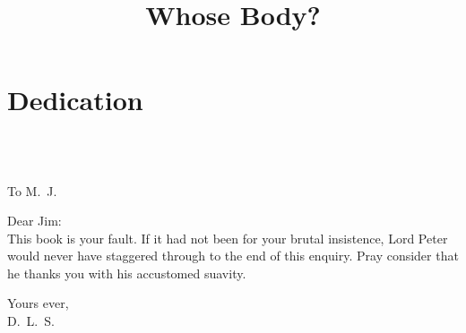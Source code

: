\documentclass[
a5paper
]{scrbook}
\title{Whose Body?}
\begin{document}
\frontmatter
 



\pagestyle{plain}




\chapter*{Dedication}
~\\
~\\
\begin{center}\Large
To M\@.~J\@.
\end{center}

\noindent Dear Jim:
~\\

This book is your fault. If it had not been for your brutal insistence, Lord Peter would never have staggered through to the end of this enquiry. Pray consider that he thanks you with his accustomed suavity.

\begin{flushright}
Yours ever,\\
D\@.~L\@.~S\@.
\end{flushright}


\tableofcontents

\mainmatter
{}
\pagestyle{headings}
















\clearpage
{}
\end{document}
